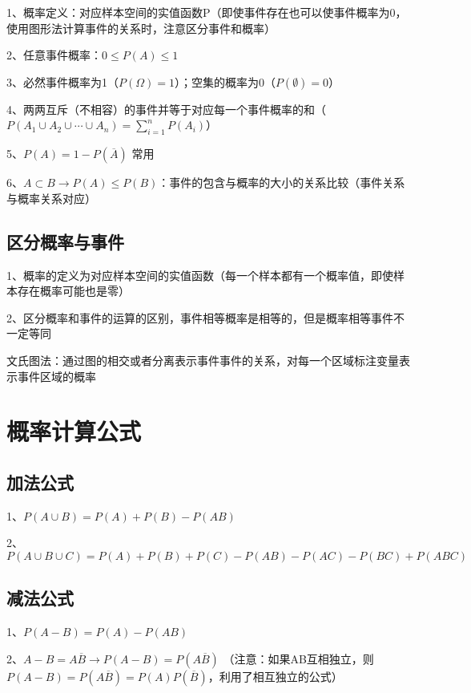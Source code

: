 1、概率定义：对应样本空间的实值函数P（即使事件存在也可以使事件概率为0，使用图形法计算事件的关系时，注意区分事件和概率）

2、任意事件概率：$0 \leqslant P(A)\leqslant 1$

3、必然事件概率为1（$P(\Omega)=1$）；空集的概率为0（$P(\emptyset)=0$）

4、两两互斥（不相容）的事件并等于对应每一个事件概率的和（$P\left(A_{1} \cup A_{2} \cup \cdots \cup A_{n}\right)=\sum_{i=1}^{n} P\left(A_{i}\right)$）

5、$P(A)=1-P(\overline A)$ 常用

6、$A \subset B\rightarrow P(A) \leqslant P(B)$：事件的包含与概率的大小的关系比较（事件关系与概率关系对应）



\subsection{区分概率与事件}

1、概率的定义为对应样本空间的实值函数（每一个样本都有一个概率值，即使样本存在概率可能也是零）

2、区分概率和事件的运算的区别，事件相等概率是相等的，但是概率相等事件不一定等同

文氏图法：通过图的相交或者分离表示事件事件的关系，对每一个区域标注变量表示事件区域的概率



\section{概率计算公式}



\subsection{加法公式}

1、$P(A\cup B) = P(A)+P(B)-P(AB)$

2、$P(A\cup B \cup C) = P(A)+P(B)+P(C)-P(AB)-P(AC)-P(BC)+P(ABC)$



\subsection{减法公式}

1、$P(A - B) = P(A)-P(AB)$

2、$A-B=A\overline B \rightarrow P(A-B) = P(A\overline B)$ （注意：如果AB互相独立，则$P(A-B) = P(A\overline B)=P(A)P(\overline B)$，利用了相互独立的公式）



